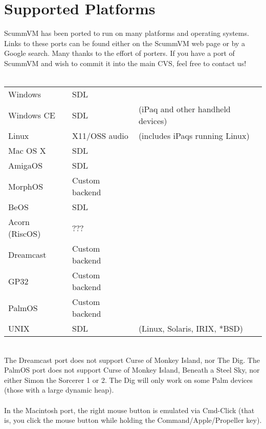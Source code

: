 

\section{Supported Platforms}
ScummVM has been ported to run on many platforms and operating systems.
Links to these ports can be found either on the ScummVM web page or by a
Google search. Many thanks to the effort of porters. If you have a port of
ScummVM and wish to commit it into the main CVS, feel free to contact us!\\
\quad \\
\begin{tabular}{lll}
Windows         & SDL\\
Windows CE      & SDL           &(iPaq and other handheld devices)\\
Linux           & X11/OSS audio &(includes iPaqs running Linux)\\
Mac OS X        & SDL\\
AmigaOS         & SDL\\
MorphOS         & Custom backend\\
BeOS            & SDL\\
Acorn (RiscOS)  & ???\\
Dreamcast       & Custom backend \\
GP32            & Custom backend\\
PalmOS          & Custom backend\\
UNIX            & SDL    &(Linux, Solaris, IRIX, *BSD)\\
\end{tabular}\\
The Dreamcast port does not support Curse of Monkey Island, nor The Dig.
The PalmOS port does not support Curse of Monkey Island, Beneath a Steel
Sky, nor either Simon the Sorcerer 1 or 2. The Dig will only work on some
Palm devices (those with a large dynamic heap).\\
\quad \\
In the Macintosh port, the right mouse button is emulated via Cmd-Click (that
is, you click the mouse button while holding the Command/Apple/Propeller key).

